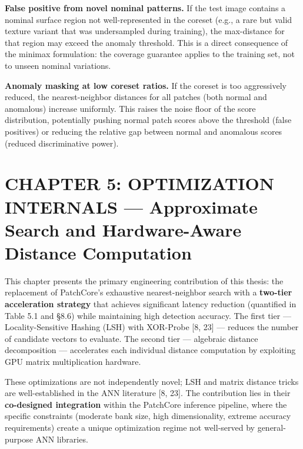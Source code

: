 \documentclass[12pt, a4paper, oneside]{report}
\begin{document}
\textbf{False positive from novel nominal patterns.} If the test image contains a nominal surface region not well-represented in the coreset (e.g., a rare but valid texture variant that was undersampled during training), the max-distance for that region may exceed the anomaly threshold. This is a direct consequence of the minimax formulation: the coverage guarantee applies to the training set, not to unseen nominal variations.

\textbf{Anomaly masking at low coreset ratios.} If the coreset is too aggressively reduced, the nearest-neighbor distances for all patches (both normal and anomalous) increase uniformly. This raises the noise floor of the score distribution, potentially pushing normal patch scores above the threshold (false positives) or reducing the relative gap between normal and anomalous scores (reduced discriminative power).

\bigskip\noindent\hrulefill\bigskip

\chapter{CHAPTER 5: OPTIMIZATION INTERNALS --- Approximate Search and Hardware-Aware Distance Computation}\label{chapter-5-optimization-internals-approximate-search-and-hardware-aware-distance-computation}

This chapter presents the primary engineering contribution of this thesis: the replacement of PatchCore's exhaustive nearest-neighbor search with a \textbf{two-tier acceleration strategy} that achieves significant latency reduction (quantified in Table 5.1 and §8.6) while maintaining high detection accuracy. The first tier --- Locality-Sensitive Hashing (LSH) with XOR-Probe {[}8, 23{]} --- reduces the number of candidate vectors to evaluate. The second tier --- algebraic distance decomposition --- accelerates each individual distance computation by exploiting GPU matrix multiplication hardware.

These optimizations are not independently novel; LSH and matrix distance tricks are well-established in the ANN literature {[}8, 23{]}. The contribution lies in their \textbf{co-designed integration} within the PatchCore inference pipeline, where the specific constraints (moderate bank size, high dimensionality, extreme accuracy requirements) create a unique optimization regime not well-served by general-purpose ANN libraries.

\bigskip\noindent\hrulefill\bigskip
\end{document}
